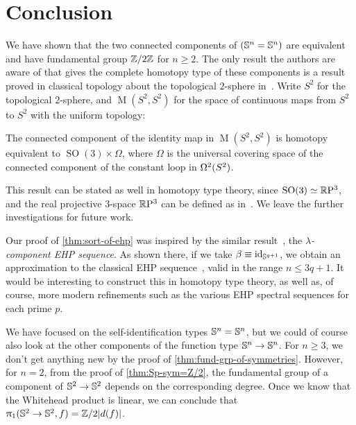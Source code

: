 \documentclass[english,a4paper]{lmcs}
\begin{document}
\section{Conclusion}
\label{sec:conclusions}


\newcommand{\topSp}{S^2}%
We have shown that the two connected components of $({\mathbb S^{n}} = {\mathbb S^{n}})$
are equivalent and have fundamental group $\mathbb{Z}/2\mathbb{Z}$ for $n\ge2$.
The only result the authors are aware of that gives
the complete homotopy type of these
components is a result proved in classical topology about the topological
$2$-sphere in~\cite[Sec.~5]{hansen}. Write $\topSp$ for the topological
$2$-sphere, and $\operatorname M(\topSp,\topSp)$ for the space of continuous
maps from $\topSp$ to $\topSp$ with the uniform topology:
\begin{thm}
  The connected component of the identity map in $\operatorname M(\topSp,\topSp)$
  is homotopy equivalent to $\operatorname{SO}(3)\times \Omega$, where $\Omega$
  is the universal covering space of the connected component of the constant
  loop in $\loopspace 2 (\topSp)$.
  \label{thm:hansen}
\end{thm}
This result can be stated as well in homotopy type theory,
since $\operatorname{SO}(3) \simeq \mathbb{R}\mathrm{P}^3$,
and the real projective $3$-space $\mathbb{R}\mathrm{P}^3$
can be defined as in~\cite{BuchholtzRijke2017}.
We leave the further investigations for future work.

Our proof of \cref{thm:sort-of-ehp} was inspired by
the similar result~\cite[Theorem~2.7]{lang1973},
the \emph{$\lambda$-component EHP sequence}.
As shown there, if we take $\beta\equiv\mathord{\mathrm{id}}_{{\mathbb S^{q+1}}}$,
we obtain an approximation to the classical EHP sequence~\cite{gwwhitehead1953}, valid in the range $n\le3q+1$.
It would be interesting to construct this in homotopy type theory,
as well as, of course, more modern refinements such as the various
EHP spectral sequences for each prime $p$.

We have focused on the self-identification types ${\mathbb S^{n}} = {\mathbb S^{n}}$,
but we could of course also look at the other components of
the function type ${\mathbb S^{n}} \to {\mathbb S^{n}}$.
For $n\ge3$, we don't get anything new by the proof of \cref{thm:fund-grp-of-symmetries}.
However, for $n=2$, from the proof of \cref{thm:Sp-sym=Z/2},
the fundamental group of a component of ${{\mathbb S^{2}}} \to {{\mathbb S^{2}}}$
depends on the corresponding degree.
Once we know that the Whitehead product is linear,
we can conclude that $\uppi_{1}({{\mathbb S^{2}}} \to {{\mathbb S^{2}}}, f) = \mathbb{Z}/2\lvert d(f)\rvert$.
\end{document}
